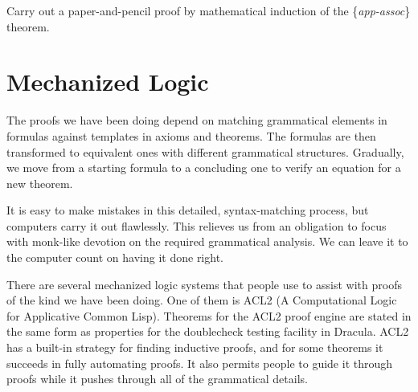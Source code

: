 
\begin{ExerciseList}
\Exercise Carry out a paper-and-pencil proof by mathematical induction of the \{\emph{app-assoc}\} theorem.

\begin{comment}
\todo{Rex: I don't understand your hint below.  Is it necessary? Ruben: Sorry. Thought they were necessary assumptions. Will omit them in the section that introduces proofs using mechanized logic.}

\Exercise State the \{\emph{app-assoc}\} theorem in ACL2 notation.
(\emph{Hint}. The theorem must be stated in the form of an implication whose hypothesis requires the objects $xs$ and $ys$ in the definition of A($n$) must be lists, so you will need to state the theorem as an implication whose hypothesis invokes the true-listp function twice to require $xs$ and $ys$ to be lists. The conclusion of the implication will, of course, be the equation between the two concatenation formulas that interchange the concatenation order.)

\Exercise Use Dracula to produce a mechanized proof of the \{\emph{app-assoc}\} theorem.
\end{comment}

\end{ExerciseList}


\section{Mechanized Logic}
\label{sec:mech-logic}
The proofs we have been doing depend on matching grammatical elements in formulas 
against templates in axioms and theorems. 
The formulas are then transformed to equivalent ones with different grammatical structures. 
Gradually, we move from a starting formula to a concluding one to verify an equation for a new theorem.

It is easy to make mistakes in this detailed, syntax-matching process, 
but computers carry it out flawlessly. 
This relieves us from an obligation to focus with monk-like devotion on the required grammatical analysis. 
We can leave it to the computer count on having it done right.

There are several mechanized logic systems that people use 
to assist with proofs of the kind we have been doing. 
One of them is ACL2 (A Computational Logic for Applicative Common Lisp). 
Theorems for the ACL2 proof engine are stated in the same form 
as properties for the doublecheck testing facility in Dracula. 
ACL2 has a built-in strategy for finding inductive proofs, 
and for some theorems it succeeds in fully automating proofs. 
It also permits people to guide it through proofs while it pushes through all of the grammatical details.

